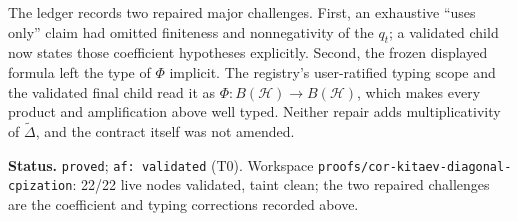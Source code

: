 The ledger records two repaired major challenges.  First, an exhaustive ``uses only''
claim had omitted finiteness and nonnegativity of the $q_t$; a validated child now states
those coefficient hypotheses explicitly.  Second, the frozen displayed formula left the
type of $\Phi$ implicit.  The registry's user-ratified typing scope and the validated final
child read it as $\Phi:B(\mathcal H)\to B(\mathcal H)$, which makes every product and
amplification above well typed.  Neither repair adds multiplicativity of
$\widetilde\Delta$, and the contract itself was not amended.

\medskip
\noindent\textbf{Status.} \texttt{proved}; \texttt{af: validated} (T0).  Workspace
\texttt{proofs/cor-kitaev-diagonal-cpization}: 22/22 live nodes validated, taint clean;
the two repaired challenges are the coefficient and typing corrections recorded above.
